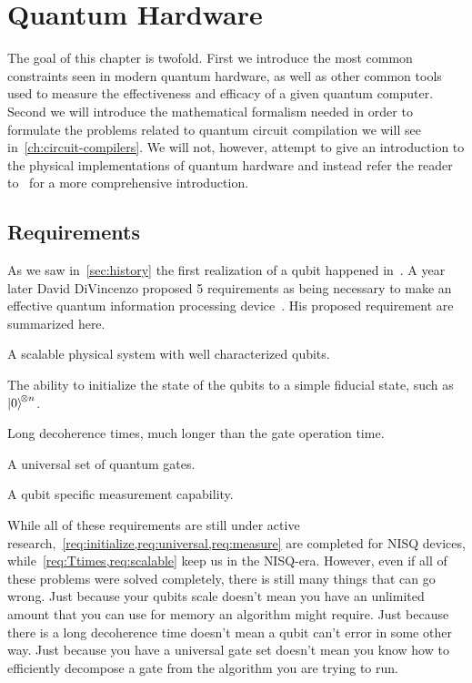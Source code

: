 \chapter{Quantum Hardware}\label{ch:hardware}

The goal of this chapter is twofold.
First we introduce the most common constraints seen in modern quantum hardware, as well as other common tools used to measure the effectiveness and efficacy of a given quantum computer.
Second we will introduce the mathematical formalism needed in order to formulate the problems related to quantum circuit compilation we will see in~\cref{ch:circuit-compilers}.
We will not, however, attempt to give an introduction to the physical implementations of quantum hardware and instead refer the reader to~\cite{nielsenchuang} for a more comprehensive introduction.

\section{Requirements}
As we saw in~\cref{sec:history} the first realization of a qubit happened in~\citeyear{firstqubit}.
A year later David DiVincenzo proposed 5 requirements as being necessary to make an effective quantum information processing device~\cite{divincenzo}.
His proposed requirement are summarized here.
\begin{requirements}
    \item A scalable physical system with well characterized qubits.\label{req:scalable}
    \item The ability to initialize the state of the qubits to a simple fiducial state, such as $\ket{0}^{\!\otimes n}$.\label{req:initialize}
    \item Long decoherence times, much longer than the gate operation time.\label{req:Ttimes}
    \item A universal set of quantum gates.\label{req:universal}
    \item A qubit specific measurement capability.\label{req:measure}
\end{requirements}
While all of these requirements are still under active research,~\cref{req:initialize,req:universal,req:measure} are completed for \ac{NISQ} devices, while~\cref{req:Ttimes,req:scalable} keep us in the \ac{NISQ}-era.
However, even if all of these problems were solved completely, there is still many things that can go wrong.
Just because your qubits scale doesn't mean you have an unlimited amount that you can use for memory an algorithm might require.
Just because there is a long decoherence time doesn't mean a qubit can't error in some other way.
Just because you have a universal gate set doesn't mean you know how to efficiently decompose a gate from the algorithm you are trying to run.

